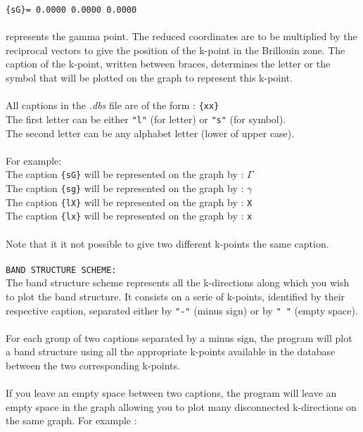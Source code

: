 \documentclass[prl]{article}
\begin{document}
\texttt{\{sG\}= 0.0000  0.0000  0.0000} \\
\\
represents the gamma point. The reduced coordinates are to be multiplied by the reciprocal vectors to give the position of the k-point in the Brillouin zone. The caption of the k-point, written between braces, determines the letter or the symbol that will be plotted on the graph to represent this k-point. \\
\\
All captions in the \textit{.dbs} file are of the form : \texttt{\{xx\}} \\
The first letter can be either \texttt{"l"} (for letter) or \texttt{"s"} (for symbol). \\
The second letter can be any alphabet letter (lower of upper case). \\
\\
For example: \\
The caption \texttt{\{sG\}} will be represented on the graph by : $\Gamma$ \\
The caption \texttt{\{sg\}} will be represented on the graph by : $\gamma$ \\
The caption \texttt{\{lX\}} will be represented on the graph by : \texttt{X} \\
The caption \texttt{\{lx\}} will be represented on the graph by : \texttt{x} \\
\\
Note that it it not possible to give two different k-points the same caption. \\
\\
\texttt{BAND STRUCTURE SCHEME:} \\
The band structure scheme represents all the k-directions along which you wish to plot the band structure. It consists on a serie of k-points, identified by their respective caption, separated either by \texttt{"-"} (minus sign) or by \texttt{" "} (empty space). \\
\\
For each group of two captions separated by a minus sign, the program will plot a band structure using all the appropriate k-points available in the database between the two corresponding k-points. \\
\\
If you leave an empty space between two captions, the program will leave an empty space in the graph allowing you to plot many disconnected k-directions on the same graph. For example : \\
\end{document}
